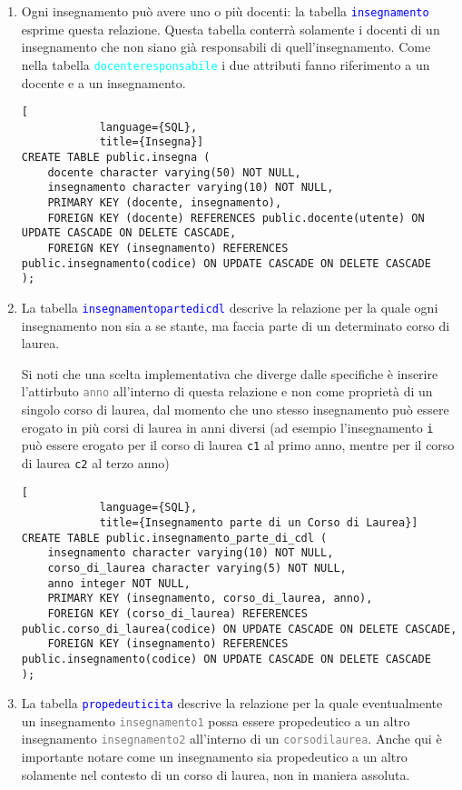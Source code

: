 \documentclass{article}
\newcommand{\tabb}[1]{\texttt{\textcolor{blue}{#1}}}
\newcommand{\tab}[1]{\texttt{\textcolor{cyan}{#1}}}
\newcommand{\attr}[1]{\texttt{\textcolor{gray}{#1}}}
\newcommand{\und}[0]{\textunderscore}
\newcommand{\alert}[0]{\textcolor{red}{\faExclamationCircle}}
\begin{document}
\begin{enumerate}
        \item Ogni insegnamento può avere uno o più docenti: la tabella \tabb{insegnamento} esprime questa relazione. Questa tabella conterrà solamente i docenti di un insegnamento che non siano già responsabili di quell'insegnamento. Come nella tabella \tab{docente\und responsabile} i due attributi fanno riferimento a un docente e a un insegnamento.
        \begin{lstlisting}[
            language={SQL},
            title={Insegna}]
CREATE TABLE public.insegna (
    docente character varying(50) NOT NULL,
    insegnamento character varying(10) NOT NULL,
    PRIMARY KEY (docente, insegnamento),
    FOREIGN KEY (docente) REFERENCES public.docente(utente) ON UPDATE CASCADE ON DELETE CASCADE,
    FOREIGN KEY (insegnamento) REFERENCES public.insegnamento(codice) ON UPDATE CASCADE ON DELETE CASCADE
);
        \end{lstlisting}

        \item La tabella \tabb{insegnamento\und parte\und di\und cdl} descrive la relazione per la quale ogni insegnamento non sia a se stante, ma faccia parte di un determinato corso di laurea.


        \alert Si noti che una scelta implementativa che diverge dalle specifiche è inserire l'attirbuto \attr{anno} all'interno di questa relazione e non come proprietà di un singolo corso di laurea, dal momento che uno stesso insegnamento può essere erogato in più corsi di laurea in anni diversi (ad esempio l'insegnamento \texttt{i} può essere erogato per il corso di laurea \texttt{c1} al primo anno, mentre per il corso di laurea \texttt{c2} al terzo anno)

        \begin{lstlisting}[
            language={SQL},
            title={Insegnamento parte di un Corso di Laurea}]
CREATE TABLE public.insegnamento_parte_di_cdl (
    insegnamento character varying(10) NOT NULL,
    corso_di_laurea character varying(5) NOT NULL,
    anno integer NOT NULL,
    PRIMARY KEY (insegnamento, corso_di_laurea, anno),
    FOREIGN KEY (corso_di_laurea) REFERENCES public.corso_di_laurea(codice) ON UPDATE CASCADE ON DELETE CASCADE,
    FOREIGN KEY (insegnamento) REFERENCES public.insegnamento(codice) ON UPDATE CASCADE ON DELETE CASCADE
);
        \end{lstlisting}

        \item La tabella \tabb{propedeuticita} descrive la relazione per la quale eventualmente un insegnamento \attr{insegnamento1} possa essere propedeutico a un altro insegnamento \attr{insegnamento2} all'interno di un \attr{corso\und di\und laurea}. Anche qui è importante notare come un insegnamento sia propedeutico a un altro solamente nel contesto di un corso di laurea, non in maniera assoluta.


\end{enumerate}
\end{document}
